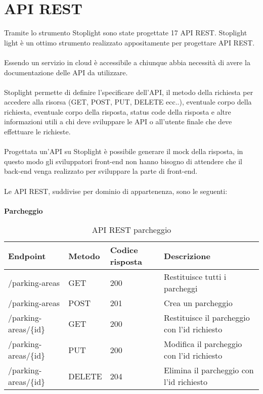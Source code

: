 \section{API REST}
Tramite lo strumento Stoplight sono state progettate 17 \gls{API} \gls{REST}. Stoplight light è un ottimo strumento realizzato
appositamente per progettare \gls{API} \gls{REST}.
\\\\
Essendo un servizio in cloud è accessibile a chiunque abbia necessità di avere la documentazione delle \gls{API} da utilizzare.
\\\\
Stoplight permette di definire l'specificare dell'\gls{API}, il metodo della richiesta per accedere alla risorsa (GET, POST, PUT, DELETE ecc..),
eventuale corpo della richiesta, eventuale corpo della risposta, status code della risposta e altre informazioni
utili a chi deve sviluppare le \gls{API} o all'utente finale che deve effettuare le richieste.
\\\\
Progettata un'\gls{API} su Stoplight è possibile generare il \gls{mock} della risposta, in questo modo gli sviluppatori \gls{front-end} non hanno bisogno
di attendere che il \gls{back-end} venga realizzato per sviluppare la parte di \gls{front-end}.
\\\\
Le \gls{API} \gls{REST}, suddivise per dominio di appartenenza, sono le seguenti:
\\\\
\textbf{Parcheggio}
\\
\begin{table}[H]
    \begin{tabular}{|p{3.2cm}|p{1.4cm}|p{1.4cm}|p{5.8cm}|} 
    \hline
    \textbf{Endpoint} & \textbf{Metodo} & \textbf{Codice risposta} & \textbf{Descrizione} \\ 
    \hline
    /parking-areas & GET & 200 & Restituisce tutti i parcheggi \\ 
    \hline
    /parking-areas & POST & 201 & Crea un parcheggio \\ 
    \hline
    /parking-areas/\{id\} & GET & 200 & Restituisce il parcheggio con l'id richiesto \\ 
    \hline
    /parking-areas/\{id\} & PUT & 200 & Modifica il parcheggio con l'id richiesto \\ 
    \hline
    /parking-areas/\{id\} & DELETE & 204 & Elimina il parcheggio con l'id richiesto \\ 
    \hline
    \end{tabular}
    \caption{API REST parcheggio}
\end{table}
